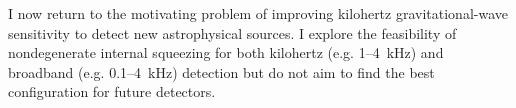 I now return to the motivating problem of improving kilohertz gravitational-wave sensitivity to detect new astrophysical sources. I explore the feasibility of nondegenerate internal squeezing for both kilohertz (e.g. 1--4~kHz) and broadband (e.g. 0.1--4~kHz) detection but do not aim to find the best configuration for future detectors. %


\label{sec:nIS_kHz}

